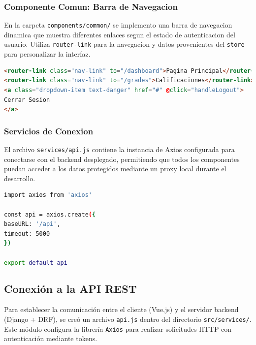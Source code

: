 \documentclass{article}
\begin{document}
        \subsubsection*{Componente Comun: Barra de Navegacion}

        En la carpeta \texttt{components/common/} se implemento una barra de navegacion dinamica que muestra diferentes enlaces segun el estado de autenticacion del usuario. Utiliza \texttt{router-link} para la navegacion y datos provenientes del \texttt{store} para personalizar la interfaz.

        \begin{lstlisting}[language=HTML, caption={Fragmento de Navbar.vue}]
<router-link class="nav-link" to="/dashboard">Pagina Principal</router-link>
<router-link class="nav-link" to="/grades">Calificaciones</router-link>
<a class="dropdown-item text-danger" href="#" @click="handleLogout">
Cerrar Sesion
</a>
        \end{lstlisting}

        \subsubsection*{Servicios de Conexion}

        El archivo \texttt{services/api.js} contiene la instancia de Axios configurada para conectarse con el backend desplegado, permitiendo que todos los componentes puedan acceder a los datos protegidos mediante un proxy local durante el desarrollo.

        \begin{lstlisting}[language=bash, caption={Instancia de Axios}]
import axios from 'axios'

const api = axios.create({
baseURL: '/api',
timeout: 5000
})

export default api
        \end{lstlisting}

\subsection{Conexión a la API REST}

Para establecer la comunicación entre el cliente (Vue.js) y el servidor backend (Django + DRF), se creó un archivo \texttt{api.js} dentro del directorio \texttt{src/services/}. Este módulo configura la librería \texttt{Axios} para realizar solicitudes HTTP con autenticación mediante tokens.
\end{document}
